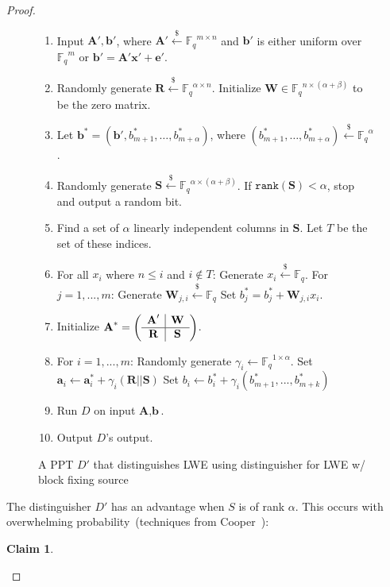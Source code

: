 \documentclass[11pt]{article}
\newcommand{\vect}[1]{\ensuremath{\textbf{#1}}}
\newcommand{\Fq}{\ensuremath{\mathbb{F}_q}}
\newcommand{\rank}{\ensuremath{\mathtt{rank}}\xspace}
\newtheorem{claim}[theorem]{Claim}
\newcommand{\ve}{\vect{e}}
\newcommand{\vS}{\vect{S}}
\newcommand{\vA}{\vect{A}}
\newcommand{\vW}{\vect{W}}
\newcommand{\vR}{\vect{R}}
\newcommand{\vx}{\vect{x}}
\newcommand{\va}{\vect{a}}
\newcommand{\vb}{\vect{b}}
\begin{document}
\begin{proof}
\begin{figure}[t]
\begin{framed}
\begin{enumerate}
\item Input $\vA', \vb'$, where $\vA' \overset{\$} \leftarrow \Fq^{m\times n}$ and $\vb'$ is either uniform over $\Fq^m$ or $\vb' = \vA'\vx' +\ve'$.
\item Randomly generate $\vect{R} \overset{\$}\leftarrow \Fq^{\alpha \times n}$. Initialize $\vW \in \Fq^{n\times (\alpha+\beta)}$ to be the zero matrix.
\item Let $\vb^* = (\vb', b^*_{m+1}, \ldots,b^*_{m+\alpha})$, where $(b^*_{m+1}, \ldots, b^*_{m+\alpha} )\overset{\$} \leftarrow \Fq^\alpha$.\label{step:b generation}
\item Randomly generate $\vect{S} \overset{\$}\leftarrow \Fq^{\alpha \times (\alpha+\beta)}$.
		\subitem If $\rank(\vect{S})<\alpha$, stop and output a random bit.
\item Find a set of $\alpha$ linearly independent columns in $\vS$.  Let $T$ be the set of these indices.
\item For all $x_i$ where $n\leq i$ and $i\not \in T$:\label{step:fill in matrix}
\subitem Generate $x_i\overset{\$}\leftarrow \Fq$.  
\subitem For $j=1,..., m$:
\subsubitem Generate $\vW_{j, i}\overset{\$}\leftarrow \Fq$
\subsubitem Set $b_j^* = b_j^* + \vW_{j, i} x_i$.
\item Initialize $\vA^*  = \left(\begin{array}{c | c}\vA' & \vW\\\hline \vR & \vS\end{array}\right)$.
\item \label{step:randomization}
For {$i=1,..., m$}:
\subitem Randomly generate $\gamma_i \leftarrow \Fq^{1 \times \alpha}$.
\subitem Set $\va_{i} \leftarrow \va^*_{i}+\gamma_i (\vR||\vS)$
\subitem Set $b_i \leftarrow b^*_i + \gamma_i (b^*_{m+1},..., b^*_{m+k})$
\item Run $D$ on input $\vA, \vb$.
\item Output $D$'s output.
\end{enumerate}
\end{framed}
\caption{A PPT $D'$ that distinguishes LWE using distinguisher for LWE w/ block fixing source}
\label{fig:perfectLWEreduction}
\end{figure}
The distinguisher $D'$ has an advantage when $S$ is of rank $\alpha$.  This occurs with overwhelming probability~(techniques from Cooper~\cite{cooper2000rank}):
\begin{claim}

\end{claim}
\end{proof}
\end{document}
